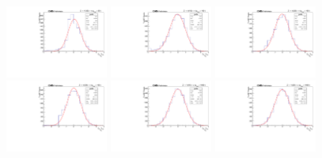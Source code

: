 \begin{figure}[!htbp]
\begin{center}
\includegraphics[width=0.3\textwidth]{figures_and_tables/modeling_xchecks/plots/ZToUpsilon3SPhoton_Cat0_signalStrenght_50/pulls}
\includegraphics[width=0.3\textwidth]{figures_and_tables/modeling_xchecks/plots/ZToUpsilon1SPhoton_Cat0_signalStrenght_100/pulls}
\includegraphics[width=0.3\textwidth]{figures_and_tables/modeling_xchecks/plots/ZToUpsilon2SPhoton_Cat0_signalStrenght_100/pulls}
\includegraphics[width=0.3\textwidth]{figures_and_tables/modeling_xchecks/plots/ZToUpsilon3SPhoton_Cat0_signalStrenght_100/pulls}
\includegraphics[width=0.3\textwidth]{figures_and_tables/modeling_xchecks/plots/ZToUpsilon1SPhoton_Cat0_signalStrenght_1000/pulls}
\includegraphics[width=0.3\textwidth]{figures_and_tables/modeling_xchecks/plots/ZToUpsilon2SPhoton_Cat0_signalStrenght_1000/pulls}

\end{center}
\end{figure}
